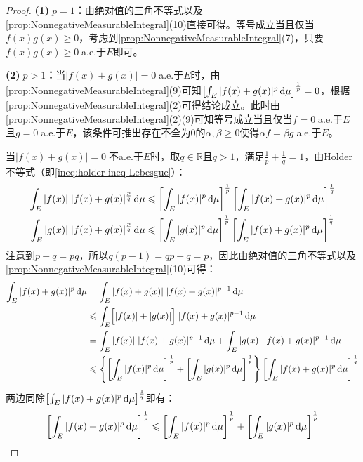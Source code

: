 \begin{proof}
	\textbf{(1)$\;p=1$：}由绝对值的三角不等式以及\cref{prop:NonnegativeMeasurableIntegral}(10)直接可得。等号成立当且仅当$f(x)g(x)\geqslant0$，考虑到\cref{prop:NonnegativeMeasurableIntegral}(7)，只要$f(x)g(x)\geqslant0\;$a.e.于$E$即可。\par
	\textbf{(2)$\;p>1$：}当$|f(x)+g(x)|=0\;$a.e.于$E$时，由\cref{prop:NonnegativeMeasurableIntegral}(9)可知$\left[\int_{E}^{}|f(x)+g(x)|^p\mathop{}\!\mathrm{d}\mu\right]^\frac{1}{p}=0$，根据\cref{prop:NonnegativeMeasurableIntegral}(2)可得结论成立。此时由\cref{prop:NonnegativeMeasurableIntegral}(2)(9)可知等号成立当且仅当$f=0\;$a.e.于$E$且$g=0\;$a.e.于$E$，该条件可推出存在不全为$0$的$\alpha,\beta\geqslant0$使得$\alpha f=\beta g\;$a.e.于$E$。\par
	当$|f(x)+g(x)|=0\;$不a.e.于$E$时，取$q\in\mathbb{R}$且$q>1$，满足$\frac{1}{p}+\frac{1}{q}=1$，由Holder不等式（即\cref{ineq:holder-ineq-Lebesgue}）：
	\begin{gather*}
		\int_{E}^{}|f(x)|\;|f(x)+g(x)|^\frac{p}{q}\mathop{}\!\mathrm{d}\mu\leqslant\left[\int_{E}^{}|f(x)|^p\mathop{}\!\mathrm{d}\mu\right]^\frac{1}{p}\left[\int_{E}^{}|f(x)+g(x)|^p\mathop{}\!\mathrm{d}\mu\right]^\frac{1}{q} \\
		\int_{E}^{}|g(x)|\;|f(x)+g(x)|^\frac{p}{q}\mathop{}\!\mathrm{d}\mu\leqslant\left[\int_{E}^{}|g(x)|^p\mathop{}\!\mathrm{d}\mu\right]^\frac{1}{p}\left[\int_{E}^{}|f(x)+g(x)|^p\mathop{}\!\mathrm{d}\mu\right]^\frac{1}{q}
	\end{gather*}
	注意到$p+q=pq$，所以$q(p-1)=qp-q=p$，因此由绝对值的三角不等式以及\cref{prop:NonnegativeMeasurableIntegral}(10)可得：
	\begin{align*}
		\int_{E}^{}|f(x)+g(x)|^p\dif\mu
		&=\int_{E}^{}|f(x)+g(x)|\;|f(x)+g(x)|^{p-1}\dif\mu \\
		&\leqslant\int_{E}^{}\Bigl[|f(x)|+|g(x)|\Bigr]\;|f(x)+g(x)|^{p-1}\dif\mu \\
		&=\int_{E}^{}|f(x)|\;|f(x)+g(x)|^{p-1}\dif\mu+\int_{E}^{}|g(x)|\;|f(x)+g(x)|^{p-1}\dif\mu \\
		&\leqslant\left\{\left[\int_{E}^{}|f(x)|^p\dif\mu\right]^\frac{1}{p}+\left[\int_{E}^{}|g(x)|^p\dif\mu\right]^\frac{1}{p}\right\}\left[\int_{E}^{}|f(x)+g(x)|^p\dif\mu\right]^\frac{1}{q}
	\end{align*}
	两边同除$\left[\int_{E}^{}|f(x)+g(x)|^p\mathop{}\!\mathrm{d}\mu\right]^\frac{1}{q}$即有：
	\begin{equation*}
			\left[\int_{E}^{}|f(x)+g(x)|^p\mathop{}\!\mathrm{d}\mu\right]^\frac{1}{p}\leqslant\left[\int_{E}^{}|f(x)|^p\mathop{}\!\mathrm{d}\mu\right]^\frac{1}{p}+\left[\int_{E}^{}|g(x)|^p\mathop{}\!\mathrm{d}\mu\right]^\frac{1}{p}
	\end{equation*}

\end{proof}
